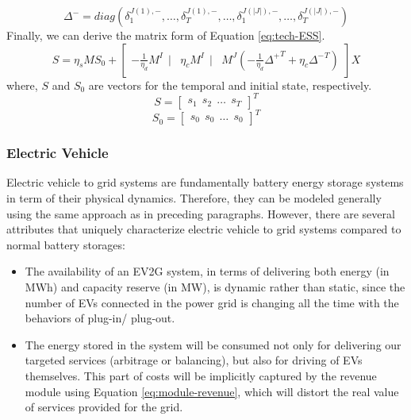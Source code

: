 \begin{equation*}
\Delta^- = diag (
\delta_1^{J(1),-}, \dots , \delta_T^{J(1),-}, \dots, \delta_1^{J(|J|),-}, \dots, \delta_T^{J(|J|),-})
\end{equation*}
\newline
Finally, we can derive the matrix form of Equation \ref{eq:tech-ESS}.
\begin{equation}
S = \eta_s M S_0 + \begin{bmatrix}
-\frac{1}{\eta_d} M^I~~|& \eta_c M^I~~|& M^J (-\frac{1}{\eta_d} {\Delta^{+}}^T + \eta_c {\Delta^{-}}^T)
\end{bmatrix} X
\end{equation}
where, $S$ and $S_0$ are vectors for the temporal and initial state, respectively.
\begin{equation*}
S = \begin{bmatrix}
s_1~~s_2~~\dots~~s_T
\end{bmatrix}^T
\end{equation*}
\begin{equation*}
S_0 = \begin{bmatrix}
s_0~~s_0~~\dots~~s_0
\end{bmatrix}^T
\end{equation*}
\subsubsection{Electric Vehicle}
Electric vehicle to grid systems are fundamentally battery energy storage systems in term of their physical dynamics. Therefore, they can be modeled generally using the same approach as in preceding paragraphs. However, there are several attributes that uniquely characterize electric vehicle to grid systems compared to normal battery storages:

\begin{itemize}
	\item The availability of an EV2G system, in terms of delivering both energy (in MWh) and capacity reserve (in MW), is dynamic rather than static, since the number of EVs connected in the power grid is changing all the time with the behaviors of plug-in/ plug-out.
	\item The energy stored in the system will be consumed not only for delivering our targeted services (arbitrage or balancing), but also for driving of EVs themselves. This part of costs will be implicitly captured by the revenue module using Equation \eqref{eq:module-revenue}, which will distort the real value of services provided for the grid. 
\end{itemize}

